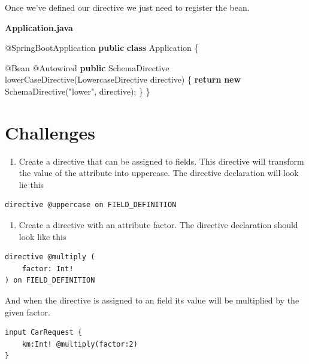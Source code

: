 \documentclass[]{book}
\newenvironment{Shaded}{\begin{snugshade}}{\end{snugshade}}
\newcommand{\KeywordTok}[1]{\textcolor[rgb]{0.13,0.29,0.53}{\textbf{#1}}}
\newcommand{\StringTok}[1]{\textcolor[rgb]{0.31,0.60,0.02}{#1}}
\newcommand{\FunctionTok}[1]{\textcolor[rgb]{0.00,0.00,0.00}{#1}}
\newcommand{\AttributeTok}[1]{\textcolor[rgb]{0.77,0.63,0.00}{#1}}
\newcommand{\NormalTok}[1]{#1}
\providecommand{\tightlist}{%
  \setlength{\itemsep}{0pt}\setlength{\parskip}{0pt}}
\begin{document}
Once we've defined our directive we just need to register the bean.

\textbf{Application.java}

\begin{Shaded}
\begin{Highlighting}[]
\AttributeTok{@SpringBootApplication}
\KeywordTok{public} \KeywordTok{class}\NormalTok{ Application \{}
    
    \AttributeTok{@Bean}
    \AttributeTok{@Autowired}
    \KeywordTok{public}\NormalTok{ SchemaDirective }\FunctionTok{lowerCaseDirective}\NormalTok{(LowercaseDirective directive) \{}
        \KeywordTok{return} \KeywordTok{new} \FunctionTok{SchemaDirective}\NormalTok{(}\StringTok{"lower"}\NormalTok{, directive);}
\NormalTok{    \}}
\NormalTok{\}}
\end{Highlighting}
\end{Shaded}

\section{Challenges}\label{challenges-4}

\begin{enumerate}
\def\labelenumi{\arabic{enumi}.}
\tightlist
\item
  Create a directive \citet{uppercase} that can be assigned to fields.
  This directive will transform the value of the attribute into
  uppercase. The directive declaration will look lie this
\end{enumerate}

\begin{verbatim}
directive @uppercase on FIELD_DEFINITION
\end{verbatim}

\begin{enumerate}
\def\labelenumi{\arabic{enumi}.}
\setcounter{enumi}{1}
\tightlist
\item
  Create a directive \citet{multiply} with an attribute factor. The
  directive declaration should look like this
\end{enumerate}

\begin{verbatim}
directive @multiply (
    factor: Int!
) on FIELD_DEFINITION
\end{verbatim}

And when the directive is assigned to an field its value will be
multiplied by the given factor.

\begin{verbatim}
input CarRequest {
    km:Int! @multiply(factor:2)
}
\end{verbatim}
\end{document}
